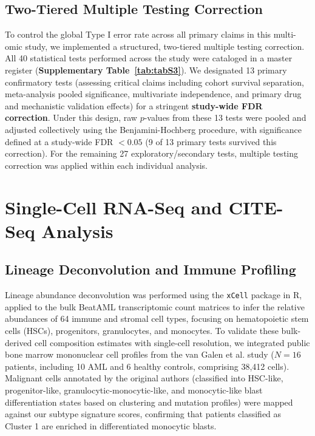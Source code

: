 \documentclass[11pt,a4paper]{article}
\begin{document}
\subsection{Two-Tiered Multiple Testing Correction}
To control the global Type I error rate across all primary claims in this multi-omic study, we implemented a structured, two-tiered multiple testing correction. All 40 statistical tests performed across the study were cataloged in a master register (\textbf{Supplementary Table~\ref{tab:tabS3}}). We designated 13 primary confirmatory tests (assessing critical claims including cohort survival separation, meta-analysis pooled significance, multivariate independence, and primary drug and mechanistic validation effects) for a stringent \textbf{study-wide FDR correction}. Under this design, raw $p$-values from these 13 tests were pooled and adjusted collectively using the Benjamini-Hochberg procedure, with significance defined at a study-wide FDR $< 0.05$ (9 of 13 primary tests survived this correction). For the remaining 27 exploratory\slash\allowbreak secondary tests, multiple testing correction was applied within each individual analysis.

\section{Single-Cell RNA-Seq and CITE-Seq Analysis}

\subsection{Lineage Deconvolution and Immune Profiling}
Lineage abundance deconvolution was performed using the \texttt{xCell} package in R, applied to the bulk BeatAML transcriptomic count matrices to infer the relative abundances of 64 immune and stromal cell types, focusing on hematopoietic stem cells (HSCs), progenitors, granulocytes, and monocytes. To validate these bulk-derived cell composition estimates with single-cell resolution, we integrated public bone marrow mononuclear cell profiles from the van Galen et al. study \cite{vangalen2019single} ($N=16$ patients, including 10 AML and 6 healthy controls, comprising 38,412 cells). Malignant cells annotated by the original authors (classified into HSC-like, progenitor-like, granulocytic-monocytic-like, and monocytic-like blast differentiation states based on clustering and mutation profiles) were mapped against our subtype signature scores, confirming that patients classified as Cluster 1 are enriched in differentiated monocytic blasts.
\end{document}
